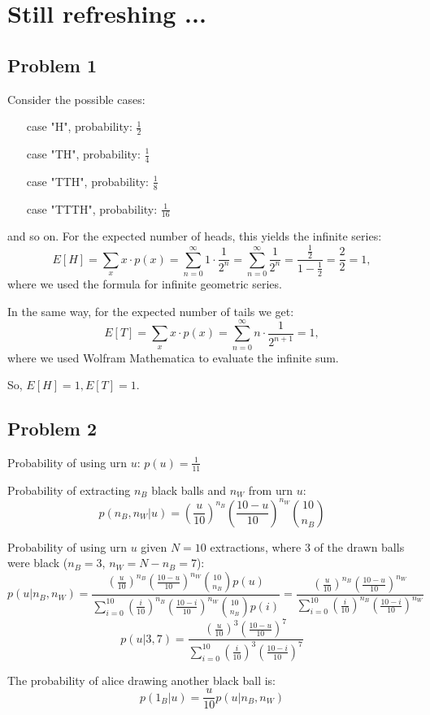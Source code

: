 
\section{Still refreshing ...}

\subsection*{Problem 1}

Consider the possible cases:
\begin{itemize}
  \item[case] "H", probability: $\frac{1}{2}$
  \item[case] "TH", probability: $\frac{1}{4}$
  \item[case] "TTH", probability: $\frac{1}{8}$
  \item[case] "TTTH", probability: $\frac{1}{16}$
\end{itemize}
and so on. For the expected number of heads, this yields the infinite series:
\begin{equation}
  E[H] = \sum_x x \cdot p(x) = \sum_{n=0}^\infty 1 \cdot \frac{1}{2^n} = 
         \sum_{n=0}^\infty \frac{1}{2^n} = \frac{\frac{1}{2}}{1 - \frac{1}{2}} = 
         \frac{2}{2} = 1,
\end{equation}
where we used the formula for infinite geometric series.

In the same way, for the expected number of tails we get:
\begin{equation}
  E[T] = \sum_x x \cdot p(x) = \sum_{n=0}^\infty n \cdot \frac{1}{2^{n+1}} = 1,
\end{equation}
where we used Wolfram Mathematica to evaluate the infinite sum.

So, $E[H] = 1, E[T] = 1$.





\subsection*{Problem 2}
Probability of using urn $u$: $p(u)=\frac{1}{11}$

Probability of extracting $n_{B}$ black balls and $n_{W}$ from urn
$u$: 
\[
p(n_{B},n_{W}|u)=\left(\frac{u}{10}\right)^{n_{B}}\left(\frac{10-u}{10}\right)^{n_{W}}\binom{10}{n_{B}}
\]

Probability of using urn $u$ given $N=10$ extractions, where $3$
of the drawn balls were black ($n_{B}=3$, $n_{W}=N-n_{B}=7$):
\[
p(u|n_{B},n_{W})=\frac{\left(\frac{u}{10}\right)^{n_{B}}\left(\frac{10-u}{10}\right)^{n_{W}}\binom{10}{n_{B}}p(u)}{\sum_{i=0}^{10}\left(\frac{i}{10}\right)^{n_{B}}\left(\frac{10-i}{10}\right)^{n_{W}}\binom{10}{n_{B}}p(i)}=\frac{\left(\frac{u}{10}\right)^{n_{B}}\left(\frac{10-u}{10}\right)^{n_{W}}}{\sum_{i=0}^{10}\left(\frac{i}{10}\right)^{n_{B}}\left(\frac{10-i}{10}\right)^{n_{W}}}
\]
\[
p(u|3,7)=\frac{\left(\frac{u}{10}\right)^{3}\left(\frac{10-u}{10}\right)^{7}}{\sum_{i=0}^{10}\left(\frac{i}{10}\right)^{3}\left(\frac{10-i}{10}\right)^{7}}
\]

The probability of alice drawing another black ball is:
\[
p(1_B | u) = \frac{u}{10} p(u | n_B , n_W)
\]
